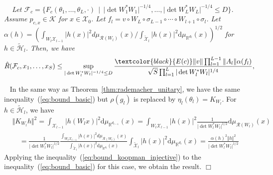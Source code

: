 \documentclass[twoside]{article}
\newenvironment{proof}[1][Proof\ ]{\medskip\noindent{\bf #1}\ }{%
\hfill $\Box$\par\quad\par}
\def\mcl#1{\mathcal{#1}}
\def\hil{\mcl{H}}
\def\nn{\nonumber}
\def\mr{\mathrm}
\def\red#1{\textcolor{black}{#1}}
\def\eqref#1{(\ref{#1})}
\newenvironment{mythm}[1][]{\medskip\par\noindent{\bfseries #1}\ \,\,\em}{\medskip\par}
\begin{document}
\begin{mythm}[Theorem~\ref{thm:rademacher_injective}]
Let $\mcl{F}_c=\{F_c(\theta_1,\ldots,\theta_L,\cdot)\,\mid\,\vert\det{W_1^*W_1}\vert^{-1/4},\ldots,\vert\det{W_L^*W_L}\vert^{-1/4}\le D\}$.
Assume $p_{c,x}\in\mcl{K}$ for $x\in \mcl{X}_0$.
Let $f_l=v\circ W_L\circ \sigma_{L-1}\circ \cdots \circ W_{l+1}\circ \sigma_l$.
Let $\alpha(h)=({\int_{W_l\mcl{X}_{l-1}} |h(x)|^2 d\mu_{\mcl{R}(W_l)}(x)}/{\int_{\tilde{\mcl{X}}_l}\vert h(x)\vert^2\mr{d}\mu_{\mathbb{R}^{d_l}}(x)})^{1/2}$ for $h\in\tilde{\hil}_l$.
Then, we have
\begin{align*}
 \hat{R}(\mcl{F}_c,x_1,\ldots,x_S)\le \sup_{\vert\det{W_l^*W_l}\vert^{-1/4}\le D}\frac{\red{E(c)}\Vert v\Vert\prod_{l=1}^{L-1}\Vert A_l\Vert \alpha(f_l)}{\sqrt{S}\prod_{l=1}^L\vert\det W_l^*W_l\vert^{1/4}},%
\end{align*}
\end{mythm}
\begin{proof}
In the same way as Theorem~\ref{thm:rademacher_unitary}, we have the same inequality~\eqref{eq:bound_basic} but $\rho(g_l)$ is replaced by $\eta_l(\theta_l)=K_{W_l}$.
For $h\in\tilde{\hil}_{l}$, we have 
\begin{align}
&\Vert K_{W_l} h\Vert^2 = \int_{\mcl{X}_{l-1}} |h(W_lx)|^2 \mr{d}\mu_{\mathbb{R}^{d_{l-1}}}(x) = \int_{W_l\mcl{X}_{l-1}} |h(x)|^2 \frac{1}{\vert\det W_l^* W_l\vert^{1/2}} \mr{d}\mu_{\mcl{R}(W_l)}(x)\nn\\
&\quad = \frac{1}{\vert\det W_l^* W_l\vert^{1/2}} \frac{\int_{W_l\mcl{X}_{l-1}} |h(x)|^2 d\mu_{\mcl{R}(W_l)}(x)}{\int_{\tilde{\mcl{X}}_l}\vert h(x)\vert^2\mr{d}\mu_{\mathbb{R}^{d_l}}(x)}\int_{\tilde{\mcl{X}}_l}\vert h(x)\vert^2\mr{d}\mu_{\mathbb{R}^{d_l}}(x) = \frac{\alpha(h)^2 \Vert h\Vert^2 }{\vert\det W_l^* W_l\vert^{1/2}}\label{eq:bound_koopman_injective}
\end{align} 
Applying the inequality~\eqref{eq:bound_koopman_injective} to the inequality~\eqref{eq:bound_basic} for this case, we obtain the result.
\end{proof}
\end{document}
